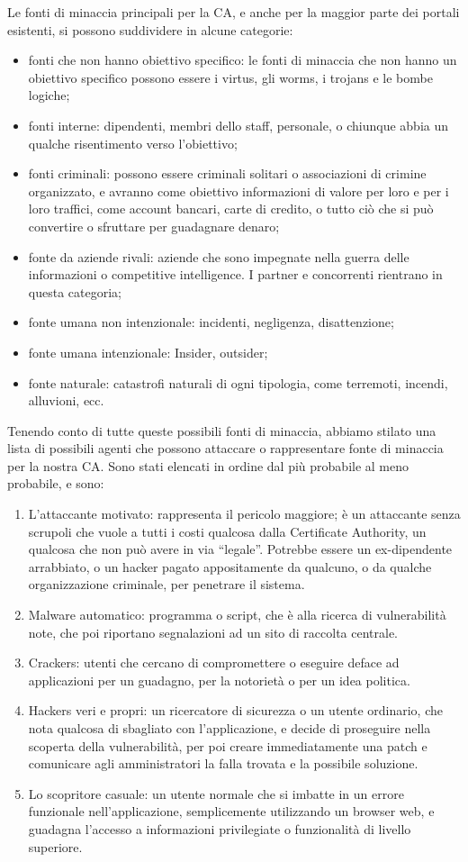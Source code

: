 \documentclass{article}
\begin{document}
Le fonti di minaccia principali per la CA, e anche per la maggior parte dei portali esistenti, si possono suddividere in alcune categorie:
\begin{itemize}
\item fonti che non hanno obiettivo specifico: le fonti di minaccia che non hanno un obiettivo specifico possono essere i virtus, gli worms, i trojans e le bombe logiche;
\item fonti interne: dipendenti, membri dello staff, personale, o chiunque abbia un qualche risentimento verso l'obiettivo;
\item fonti criminali: possono essere criminali solitari o associazioni di crimine organizzato, e avranno come obiettivo informazioni di valore per loro e per i loro traffici, come account bancari, carte di credito, o tutto ciò che si può convertire o sfruttare per guadagnare denaro;
\item fonte da aziende rivali: aziende che sono impegnate nella guerra delle informazioni o competitive intelligence. I partner e concorrenti rientrano in questa categoria;
\item fonte umana non intenzionale: incidenti, negligenza, disattenzione;
\item fonte umana intenzionale: Insider, outsider;
\item fonte naturale: catastrofi naturali di ogni tipologia, come terremoti, incendi, alluvioni, ecc.
\end{itemize}

Tenendo conto di tutte queste possibili fonti di minaccia, abbiamo stilato una lista di possibili agenti che possono attaccare o rappresentare fonte di minaccia per la nostra CA. Sono stati elencati in ordine dal più probabile al meno probabile, e sono:

\begin{enumerate}
\item L'attaccante motivato: rappresenta il pericolo maggiore; è un attaccante senza scrupoli che vuole a tutti i costi qualcosa dalla Certificate Authority, un qualcosa che non può avere in via ``legale''. Potrebbe essere un ex-dipendente arrabbiato, o un hacker pagato appositamente da qualcuno, o da qualche organizzazione criminale, per penetrare il sistema.
\item Malware automatico: programma o script, che è alla ricerca di vulnerabilità note, che poi riportano segnalazioni ad un sito di raccolta centrale.
\item Crackers: utenti che cercano di compromettere o eseguire deface ad applicazioni per un guadagno, per la notorietà o per un idea politica.
\item Hackers veri e propri: un ricercatore di sicurezza o un utente ordinario, che nota qualcosa di sbagliato con l'applicazione, e decide di proseguire nella scoperta della vulnerabilità, per poi creare immediatamente una patch e comunicare agli amministratori la falla trovata e la possibile soluzione.
\item Lo scopritore casuale: un utente normale che si imbatte in un errore funzionale nell'applicazione, semplicemente utilizzando un browser web, e guadagna l'accesso a informazioni privilegiate o funzionalità di livello superiore.
\end{enumerate}
\end{document}
